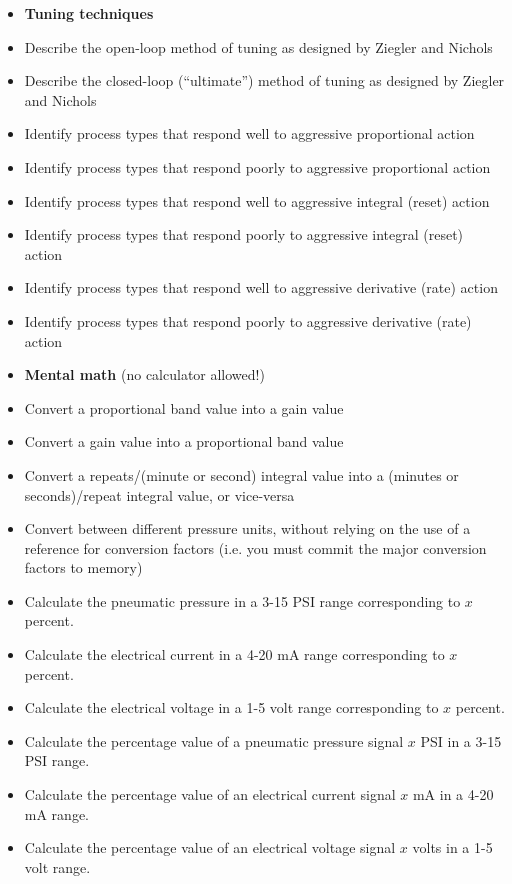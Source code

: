 \documentclass[12pt,a4paper]{article}
\begin{document}
\filbreak

\begin{itemize}
\item{} {\bf Tuning techniques}
\item{} Describe the open-loop method of tuning as designed by Ziegler and Nichols
\item{} Describe the closed-loop (``ultimate'') method of tuning as designed by Ziegler and Nichols
\item{} Identify process types that respond well to aggressive proportional action
\item{} Identify process types that respond poorly to aggressive proportional action
\item{} Identify process types that respond well to aggressive integral (reset) action
\item{} Identify process types that respond poorly to aggressive integral (reset) action
\item{} Identify process types that respond well to aggressive derivative (rate) action
\item{} Identify process types that respond poorly to aggressive derivative (rate) action
\end{itemize}

\filbreak

\begin{itemize}
\item{} {\bf Mental math} (no calculator allowed!)
\item{} Convert a proportional band value into a gain value
\item{} Convert a gain value into a proportional band value
\item{} Convert a repeats/(minute or second) integral value into a (minutes or seconds)/repeat integral value, or vice-versa
\item{} Convert between different pressure units, without relying on the use of a reference for conversion factors (i.e. you must commit the major conversion factors to memory)
\item{} Calculate the pneumatic pressure in a 3-15 PSI range corresponding to $x$ percent.
\item{} Calculate the electrical current in a 4-20 mA range corresponding to $x$ percent.
\item{} Calculate the electrical voltage in a 1-5 volt range corresponding to $x$ percent.
\item{} Calculate the percentage value of a pneumatic pressure signal $x$ PSI in a 3-15 PSI range.
\item{} Calculate the percentage value of an electrical current signal $x$ mA in a 4-20 mA range.
\item{} Calculate the percentage value of an electrical voltage signal $x$ volts in a 1-5 volt range.
\end{itemize}
\end{document}

